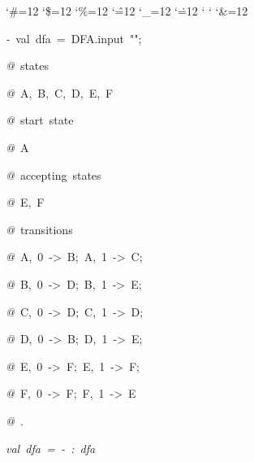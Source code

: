 \begin{list}{}
{\setlength{\leftmargin}{\leftmargini}
\setlength{\rightmargin}{0cm}
\setlength{\itemindent}{0cm}
\setlength{\listparindent}{0cm}
\setlength{\itemsep}{0cm}
\setlength{\parsep}{0cm}
\setlength{\labelsep}{0cm}
\setlength{\labelwidth}{0cm}
\catcode`\#=12
\catcode`\$=12
\catcode`\%=12
\catcode`\^=12
\catcode`\_=12
\catcode`\.=12
\catcode`
\catcode`
\catcode`\&=12
\ttfamily}
\small
\item[]\textsl{-\ }val\ dfa\ =\ DFA.input\ "";
\item[]\textsl{@\ }states
\item[]\textsl{@\ }A,\ B,\ C,\ D,\ E,\ F
\item[]\textsl{@\ }start\ state
\item[]\textsl{@\ }A
\item[]\textsl{@\ }accepting\ states
\item[]\textsl{@\ }E,\ F
\item[]\textsl{@\ }transitions
\item[]\textsl{@\ }A,\ 0\ ->\ B;\ A,\ 1\ ->\ C;
\item[]\textsl{@\ }B,\ 0\ ->\ D;\ B,\ 1\ ->\ E;
\item[]\textsl{@\ }C,\ 0\ ->\ D;\ C,\ 1\ ->\ D;
\item[]\textsl{@\ }D,\ 0\ ->\ B;\ D,\ 1\ ->\ E;
\item[]\textsl{@\ }E,\ 0\ ->\ F;\ E,\ 1\ ->\ F;
\item[]\textsl{@\ }F,\ 0\ ->\ F;\ F,\ 1\ ->\ E
\item[]\textsl{@\ }.
\item[]\textsl{val\ dfa\ =\ -\ :\ dfa}
\end{list}
